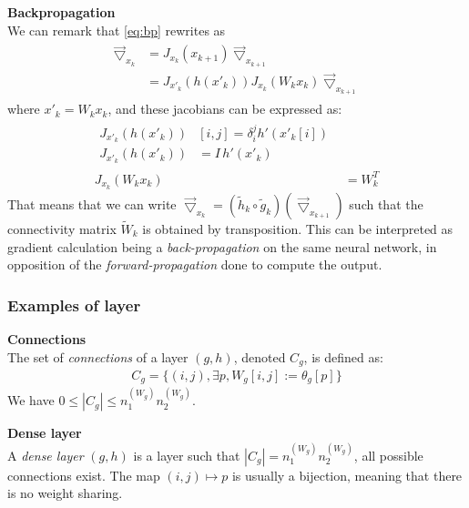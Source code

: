 \begin{remark}\textbf{Backpropagation}\\
We can remark that \eqref{eq:bp} rewrites as
\begin{align}
  \begin{split}
  \vec{\bigtriangledown}_{x_k} & = J_{x_k}(x_{k+1}) \vec{\bigtriangledown}_{x_{k+1}} \\ 
                               & = J_{x'_k}(h(x'_k)) J_{x_k}(W_k x_k) \vec{\bigtriangledown}_{x_{k+1}}
  \end{split}
\end{align}
where $x'_k = W_k x_k$, and these jacobians can be expressed as:
\begin{align}
  \begin{split}
  J_{x'_k}(h(x'_k)) & [i,j] = \delta_i^j h'(x'_k[i])\\
  J_{x'_k}(h(x'_k)) & = I \hspace{2pt} h'(x'_k)
  \end{split}\\
  J_{x_k}(W_k x_k) & = W_k^T
\end{align}
That means that we can write $\vec{\bigtriangledown}_{x_k} = (\widetilde{h}_k \circ \widetilde{g}_k)(\vec{\bigtriangledown}_{x_{k+1}})$ such that the connectivity matrix $\widetilde{W}_k$ is obtained by transposition. This can be interpreted as gradient calculation being a \emph{back-propagation} on the same neural network, in opposition of the \emph{forward-propagation} done to compute the output.
\end{remark}

\subsubsection{Examples of layer}

\begin{definition}\textbf{Connections}\\
The set of \emph{connections} of a layer $(g,h)$, denoted $C_g$, is defined as:
\begin{gather*}
  C_g = \{(i,j), \exists p, W_g[i,j] := \theta_g[p]\}
\end{gather*}
We have $0 \leq |C_g| \leq n_1^{(W_g)} n_2^{(W_g)}$.
\end{definition}

\begin{definition}\textbf{Dense layer}\\
A \emph{dense layer} $(g,h)$ is a layer such that $|C_g| = n_1^{(W_g)} n_2^{(W_g)}$, \ie all possible connections exist. The map $(i,j) \mapsto p$ is usually a bijection, meaning that there is no weight sharing.
\end{definition}

